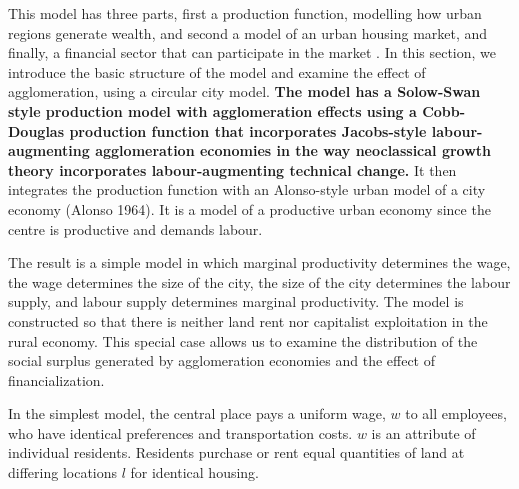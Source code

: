 This model has three  parts, first a production function, modelling how urban regions generate wealth, and second a model of an urban housing market, and finally, a financial sector that can participate in the market . 
In this section, we introduce the basic structure of the model and examine the effect of agglomeration, using a circular city model.  
\textbf{The model has a Solow-Swan style production model with agglomeration effects using a Cobb-Douglas production function that incorporates Jacobs-style labour-augmenting agglomeration economies %
in the way neoclassical growth theory incorporates labour-augmenting technical change.}
It then integrates the production function with an Alonso-style urban model of a city economy (Alonso 1964). 
It is a model of a productive urban economy since the centre is productive and demands labour.


The result is a simple model in which marginal productivity determines the wage, the wage determines the size of the city, the size of the city determines the labour supply, and labour supply determines marginal productivity. 
The model is constructed so that there is neither land rent nor capitalist exploitation in the rural economy. 
This special case allows us to examine the distribution of the social surplus generated by agglomeration economies and the effect of financialization.

In the simplest model, the central place pays a uniform wage, $w$ to all employees, who have identical preferences and transportation costs. $w$ is an attribute of individual residents. Residents  purchase or rent equal quantities of land at differing locations $l$ for identical housing.  

